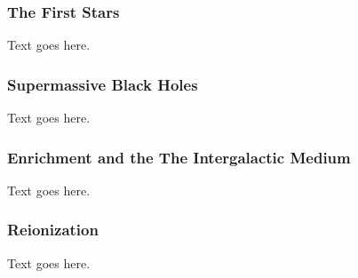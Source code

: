 \subsubsection{The First Stars}
\label{subsubsec:early_universe--baryonic_processes--first_stars}


Text goes here.



\subsubsection{Supermassive Black Holes}
\label{subsubsec:early_universe--baryonic_processes--smbhs}


Text goes here.



\subsubsection{Enrichment and the The Intergalactic Medium}
\label{subsubsec:early_universe--baryonic_processes--igm}


Text goes here.



\subsubsection{Reionization}
\label{subsubsec:early_universe--baryonic_processes--reionization}


Text goes here.




